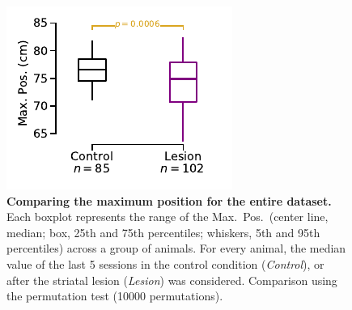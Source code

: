\begin{figure}[!h]
  \begin{center}
    \includegraphics[scale=1]{ch-appendicies/figures/AllRatMaxPos.pdf}
    \caption[Max.\ Pos.\ Comparison]
    {\textbf{Comparing the maximum position for the entire dataset.}
    Each boxplot represents the range of the Max.\ Pos.\ (center line, median; box, 25th and 75th percentiles; whiskers, 5th and 95th percentiles) across a group of animals.
    For every animal, the median value of the last 5 sessions in the control condition (\textit{Control}), or after the striatal lesion (\textit{Lesion}) was considered.
    Comparison using the permutation test (10000 permutations).
    }
    \label{fig:appendix:AllRatMaxPos}
  \end{center}
\end{figure} 